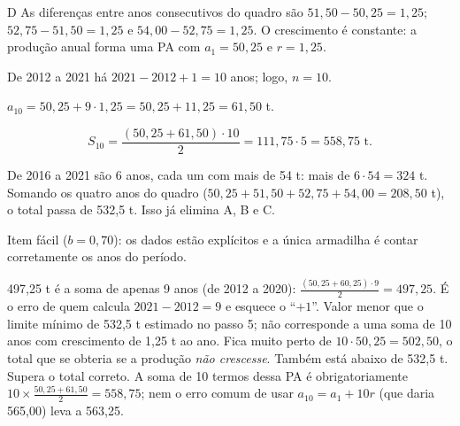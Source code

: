 \begin{resolucao}{D}
 As diferenças entre anos consecutivos
do quadro são $51{,}50 - 50{,}25 = 1{,}25$; $52{,}75 - 51{,}50 = 1{,}25$ e
$54{,}00 - 52{,}75 = 1{,}25$. O crescimento é constante: a produção anual forma
uma PA com $a_1 = 50{,}25$ e $r = 1{,}25$.

 De 2012 a 2021 há $2021 - 2012 + 1 = 10$ anos;
logo, $n = 10$.

 $a_{10} = 50{,}25 + 9 \cdot 1{,}25 = 50{,}25 + 11{,}25 = 61{,}50$ t.

\[
S_{10} = \frac{(50{,}25 + 61{,}50)\cdot 10}{2} = 111{,}75 \cdot 5 = 558{,}75 \text{ t}.
\]

 De 2016 a 2021 são 6 anos, cada um com
mais de 54 t: mais de $6 \cdot 54 = 324$ t. Somando os quatro anos do quadro
($50{,}25 + 51{,}50 + 52{,}75 + 54{,}00 = 208{,}50$ t), o total passa de
532,5 t. Isso já elimina A, B e C.


Item fácil ($b = 0{,}70$): os dados estão explícitos e a única armadilha é
contar corretamente os anos do período.

\begin{distratores}
 497,25 t é a soma de apenas 9 anos (de 2012 a 2020):
$\frac{(50{,}25 + 60{,}25)\cdot 9}{2} = 497{,}25$. É o erro de quem calcula
$2021 - 2012 = 9$ e esquece o “$+1$”.
 Valor menor que o limite mínimo de 532,5 t estimado no passo 5; não
corresponde a uma soma de 10 anos com crescimento de 1,25 t ao ano.
 Fica muito perto de $10 \cdot 50{,}25 = 502{,}50$, o total que se
obteria se a produção \emph{não crescesse}. Também está abaixo de 532,5 t.
 Supera o total correto. A soma de 10 termos dessa PA é obrigatoriamente
$10 \times \frac{50{,}25 + 61{,}50}{2} = 558{,}75$; nem o erro comum de usar
$a_{10} = a_1 + 10r$ (que daria 565,00) leva a 563,25.
\end{distratores}
\end{resolucao}

